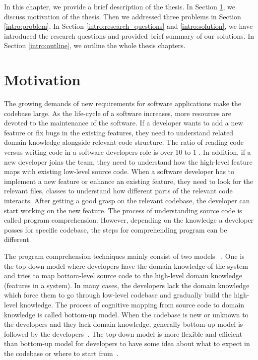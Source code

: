 In this chapter, we provide a brief description of the thesis. In Section \ref{intro:motivation}, we discuss motivation of the thesis. Then we addressed three problems in Section \ref{intro:problem}. In Section \ref{intro:research_questions} and \ref{intro:solution}, we have introduced the research questions and provided brief summary of our solutions. In Section \ref{intro:outline}, we outline the whole thesis chapters. 


\section{Motivation}
\label{intro:motivation}
 The growing demands of new requirements for software applications make the codebase large. As the life-cycle of a software increases, more resources are devoted to the maintenance of the software. If a developer wants to add a new feature or fix bugs in the existing features, they need to understand related domain knowledge alongside relevant code structure. The ratio of reading code versus writing code in a software developers role is over 10 to 1 \cite{martin2008clean}. In addition, if a new developer joins the team, they need to understand how the high-level feature maps with existing low-level source code. When a software developer has to implement a new feature or enhance an existing feature, they need to look for the relevant files, classes to understand how different parts of the relevant code interacts. After getting a good grasp on the relevant codebase, the developer can start working on the new feature. The process of understanding source code is called program comprehension. However, depending on the knowledge a developer posses for specific codebase, the steps for comprehending program can be different.
 
 
The program comprehension techniques mainly consist of two models ~\cite{tilley1998reverseEngineeringFramework, von1993programToolRequirements, siegmund2016programPastFuture}. One is the top-down model where developers have the domain knowledge of the system and tries to map bottom-level source code to the high-level domain knowledge (features in a system). In many cases, the developers lack the domain knowledge which force them to go through low-level codebase and gradually build the high-level knowledge. The process of cognitive mapping from source code to domain knowledge is called bottom-up model. When the codebase is new or unknown to the developers and they lack domain knowledge, generally bottom-up model is followed by the developers~\cite{wei2002surveyCategorizationComprehension, siegmund2016programPastFuture}. The top-down model is more flexible and efficient than bottom-up model for developers to have some idea about what to expect in the codebase or where to start from~\cite{brooks1983theoryComprehensionPrograms}. 
 

